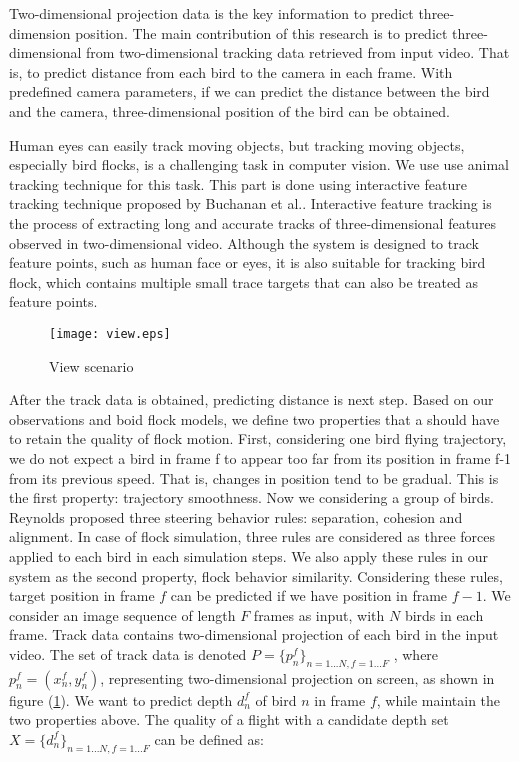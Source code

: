 Two-dimensional projection data is the key information to predict three-dimension position. The main contribution of this research is to predict three-dimensional from two-dimensional tracking data retrieved from input video. That is, to predict distance from each bird to the camera in each frame. With predefined camera parameters, if we can predict the distance between the bird and the camera, three-dimensional position of the bird can be obtained.


Human eyes can easily track moving objects, but tracking moving objects, especially bird flocks, is a challenging task in computer vision. We use use animal tracking technique for this task. This part is done using interactive feature tracking technique proposed by Buchanan et al.\cite{Tracking}. Interactive feature tracking is the process of extracting long and accurate tracks of three-dimensional features observed in two-dimensional video. Although the system is designed to track feature points, such as human face or eyes, it is also suitable for tracking bird flock, which contains multiple small trace targets that can also be treated as feature points.


\begin{figure}[h]
 \begin{center}
  \texttt{[image: view.eps]}
 \end{center}
 \caption{View scenario}
 \label{figure:view}
\end{figure}


After the track data is obtained, predicting distance is next step. Based on our observations and boid flock models, we define two properties that a should have to retain the quality of flock motion. First, considering one bird flying trajectory, we do not expect a bird in frame f to appear too far from its position in frame f-1 from its previous speed. That is, changes in position tend to be gradual. This is the first property: trajectory smoothness. Now we considering a group of birds. Reynolds proposed three steering behavior rules: separation, cohesion and alignment\cite{Boid}. In case of flock simulation, three rules are considered as three forces applied to each bird in each simulation steps. We also apply these rules in our system as the second property, flock behavior similarity. Considering these rules, target position in frame $f$ can be predicted if we have position in frame $f-1$. We consider an image sequence of length $F$ frames as input, with $N$ birds in each frame. Track data contains two-dimensional projection of each bird in the input video. The set of track data is denoted $P=\big\{p_n^f\big\}_{n=1...N,f=1...F}$ , where $p_n^f=(x_n^f, y_n^f)$, representing two-dimensional projection on screen, as shown in figure (\ref{figure:view}). We want to predict depth $d_n^f$ of bird $n$ in frame $f$, while maintain the two properties above. The quality of a flight with a candidate depth set $X=\big\{d_n^f\big\}_{n=1...N,f=1...F}$ can be defined as:


